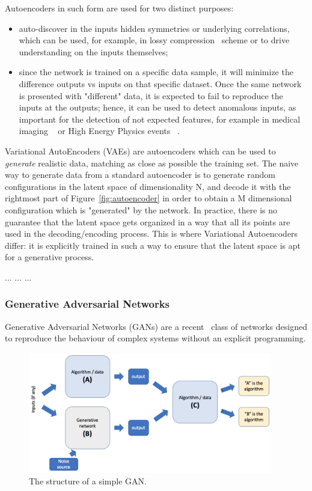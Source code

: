  Autoencoders in such form are used for two distinct purposes:
 \begin{itemize}
     \item auto-discover in the inputs hidden symmetries or underlying correlations, which can be used, for example, in lossy compression~\cite{compression} scheme or to drive understanding on the inputs themselves; %
     \item since the network is trained on a specific data sample, it will minimize the difference outputs vs inputs on that specific dataset. Once the same network is presented with "different" data, it is expected to fail to reproduce the inputs at the outputs; hence, it can be used to detect anomalous inputs, as important for the detection of not expected features, for example in medical imaging ~\cite{anomalymed} or High Energy Physics events ~\cite{anomalyhep}. 
 \end{itemize}
 
Variational AutoEncoders (VAEs) are autoencoders which can be used to \emph{generate} realistic data, matching as close as possible the  training set. The naive way to generate data from a standard autoencoder is to generate random configurations in the latent space of dimensionality N, and decode it with the rightmost part of Figure~\ref{fig:autoencoder} in order to obtain a M dimensional configuration which is "generated" by the network. In practice, there is no guarantee that the latent space gets organized in a way that all its points are used in the decoding/encoding process. This is where Variational Autoencoders differ: it is explicitly trained in such a way to ensure that the latent space is apt for a generative process.

...
...
...

\subsubsection{Generative Adversarial Networks}
Generative Adversarial Networks (GANs) are a recent~\cite{goodfellow} class of networks designed to reproduce the behaviour of complex systems without an explicit programming.

\begin{figure}[h]
     \centering
     \includegraphics[width=0.95\textwidth]{images/gan.png}
     \caption{The structure of a simple GAN.}
     \label{fig:gan}
 \end{figure}

